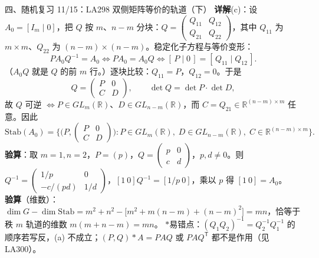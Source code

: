 \documentclass[aspectratio=169,10pt,fontset=none]{ctexbeamer}
\newcommand{\key}[1]{\textcolor{ink}{\bfseries #1}}
\newcommand{\starpt}{\textcolor{accent}{\bfseries$\ast$}}
\begin{document}
\begin{frame}[t]{四、随机复习 11/15：LA298 双侧矩阵等价的轨道（下）}
\scriptsize
\key{详解}(c)：设 $A_0=[I_m\mid 0]$，把 $Q$ 按 $m$、$n-m$ 分块：$Q=\begin{pmatrix}Q_{11}&Q_{12}\\ Q_{21}&Q_{22}\end{pmatrix}$，其中 $Q_{11}$ 为 $m\times m$、$Q_{22}$ 为 $(n-m)\times(n-m)$。稳定化子方程与等价变形：
\[
PA_0Q^{-1}=A_0\iff PA_0=A_0Q\iff [\,P\mid 0\,]=[\,Q_{11}\mid Q_{12}\,].
\]
（$A_0Q$ 就是 $Q$ 的前 $m$ 行。）逐块比较：$Q_{11}=P$，$Q_{12}=0$。于是
\[
Q=\begin{pmatrix}P&0\\ C&D\end{pmatrix},\qquad \det Q=\det P\cdot\det D,
\]
故 $Q$ 可逆 $\iff P\in GL_m(\mathbb R)$、$D\in GL_{n-m}(\mathbb R)$，而 $C=Q_{21}\in\mathbb R^{(n-m)\times m}$ 任意。因此
\[
\mathrm{Stab}(A_0)=\Big\{\Big(P,\begin{pmatrix}P&0\\ C&D\end{pmatrix}\Big):P\in GL_m(\mathbb R),\;D\in GL_{n-m}(\mathbb R),\;C\in\mathbb R^{(n-m)\times m}\Big\}.
\]
\key{验算}：取 $m=1,n=2$，$P=(p)$，$Q=\begin{pmatrix}p&0\\ c&d\end{pmatrix}$，$p,d\ne0$。则 $Q^{-1}=\begin{pmatrix}1/p&0\\ -c/(pd)&1/d\end{pmatrix}$，$[1\ 0]Q^{-1}=[1/p\ 0]$，乘以 $p$ 得 $[1\ 0]=A_0$。\\[1pt]
\key{验算}（维数）：$\dim G-\dim\mathrm{Stab}=m^2+n^2-\big[m^2+m(n-m)+(n-m)^2\big]=mn$，恰等于秩 $m$ 轨道的维数 $m(m+n-m)=mn$。
\starpt 易错点：$(Q_1Q_2)^{-1}=Q_2^{-1}Q_1^{-1}$ 的顺序若写反，(a) 不成立；$(P,Q)*A=PAQ$ 或 $PAQ^{\mathsf T}$ 都不是作用（见 LA300）。
\end{frame}
\end{document}
